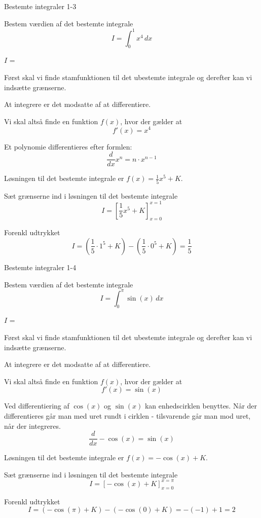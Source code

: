 \documentclass{article}
\begin{document}
\newpage

\begin{exercise}{Bestemte integraler 1-3}

Bestem værdien af det bestemte integrale
\[
I = \int_0^1 x^4 \, dx
\]

$I$ = 


\hint
Først skal vi finde stamfunktionen til det ubestemte integrale og derefter kan vi indsætte grænserne.

\hint
At integrere er det modsatte af at differentiere.

\hint
Vi skal altså finde en funktion $f(x)$, hvor der gælder at
\[
f'(x) = x^4
\]

\hint
Et polynomie differentieres efter formlen:
\[
\frac{d}{dx} x^n = n \cdot x^{n - 1}
\]

\hint
Løsningen til det bestemte integrale er $f(x) = \frac{1}{5} x^5 + K$.

\hint
Sæt grænserne ind i løsningen til det bestemte integrale
\[
I = \left[ \frac{1}{5} x^5 + K \right]_{x=0}^{x=1}
\]

\hint
Forenkl udtrykket
\[
I = \left( \frac{1}{5} \cdot 1^5 + K \right) - \left( \frac{1}{5} \cdot 0^5 + K \right) = \frac{1}{5}
\]


\end{exercise}

\newpage

\begin{exercise}{Bestemte integraler 1-4}

Bestem værdien af det bestemte integrale
\[
I = \int_0^{\pi} \sin(x) \, dx
\]

$I$ = 


\hint
Først skal vi finde stamfunktionen til det ubestemte integrale og derefter kan vi indsætte grænserne.

\hint
At integrere er det modsatte af at differentiere.

\hint
Vi skal altså finde en funktion $f(x)$, hvor der gælder at
\[
f'(x) = \sin(x)
\]

\hint
Ved differentiering af $\cos(x)$ og $\sin(x)$ kan enhedscirklen benyttes. Når der differentieres går man med uret rundt i cirklen - tilsvarende går man mod uret, når der integreres.
\[
\frac{d}{dx} - \cos(x) = \sin(x)
\]

\hint
Løsningen til det bestemte integrale er $f(x) = - \cos(x) + K$.

\hint
Sæt grænserne ind i løsningen til det bestemte integrale
\[
I = \left[- \cos(x) + K \right]_{x=0}^{x=\pi}
\]

\hint
Forenkl udtrykket
\[
I = \left(- \cos(\pi) + K \right) - \left(- \cos(0) + K \right) = - (-1) + 1 = 2
\]


\end{exercise}
\end{document}
